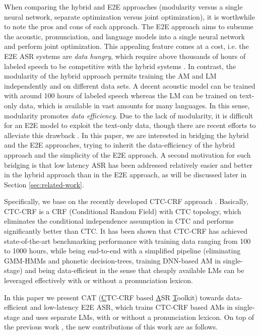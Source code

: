 \documentclass[a4paper]{article}
\begin{document}
When comparing the hybrid and E2E approaches (modularity versus a single neural network, separate optimization versus joint optimization), it is worthwhile to note the pros and cons of each approach.
The E2E approach aims to subsume the acoustic, pronunciation, and language models into a single neural network and perform joint optimization.
This appealing feature comes at a cost, i.e. the E2E ASR systems are \emph{data hungry}, which require above thousands of hours of labeled speech to be competitive with the hybrid systems \cite{vs,chiu2018state,tuske2019advancing}.
In contrast, the modularity of the hybrid approach permits training the AM and LM independently and on different data sets. A decent acoustic model can be trained with around 100 hours of labeled speech whereas the LM can be trained on text-only data, which is available in vast amounts for many languages. In this sense, modularity promotes \emph{data efficiency}.
Due to the lack of modularity, it is difficult for an E2E model to exploit the text-only data, though there are recent efforts to alleviate this drawback \cite{toshniwal2018comparison,pham2019independent}.
In this paper, we are interested in bridging the hybrid and the E2E approaches, trying to inherit the data-efficiency of the hybrid approach and the simplicity of the E2E approach. 
A second motivation for such bridging is that low latency ASR has been addressed relatively easier and better in the hybrid approach than in the E2E approach, as will be discussed later in Section \ref{sec:related-work}.

Specifically, we base on the recently developed CTC-CRF approach \cite{Xiang2019CRF}. Basically, CTC-CRF is a CRF (Conditional Random Field) with CTC topology, which eliminates the conditional independence assumption in CTC and performs significantly better than CTC.
It has been shown \cite{Xiang2019CRF} that CTC-CRF has achieved state-of-the-art benchmarking performance with training data ranging from 100 to 1000 hours, while being end-to-end with a simplified pipeline (eliminating GMM-HMMs and phonetic decision-trees, training DNN-based AM in single-stage) and being data-efficient in the sense that cheaply available LMs can be leveraged effectively with or without a pronunciation lexicon.

In this paper we present CAT (\underline{C}TC-CRF based \underline{A}SR \underline{T}oolkit) towards data-efficient and low-latency E2E ASR, which trains CTC-CRF based AMs in single-stage and uses separate LMs, with or without a pronunciation lexicon.
On top of the previous work \cite{Xiang2019CRF}, the new contributions of this work are as follows.
\end{document}
